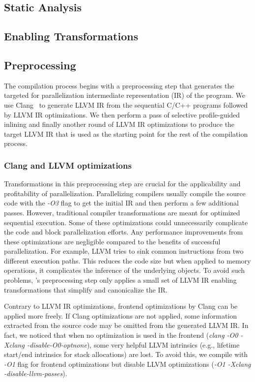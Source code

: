 \subsection {Static Analysis}


\subsection{Enabling Transformations}
\label{design_transf}



\subsection{Preprocessing}

The compilation process begins with a preprocessing step that
generates the targeted for parallelization intermediate representation
(IR) of the program. We use Clang~\cite{LLVM:CGO04} to generate LLVM IR
from the sequential C/C++ programs followed by LLVM IR optimizations.
We then perform a pass of selective profile-guided
inlining and finally another round of LLVM IR optimizations to produce
the target LLVM IR that is used as the starting point for the rest of
the compilation process.

\subsubsection{Clang and LLVM optimizations}

Transformations in this preprocessing step are crucial for the
applicability and profitability of parallelization.
%
Parallelizing compilers usually compile the source code with the \textit{-O3}
flag to get the initial IR and then perform a few additional
passes.
However, traditional compiler transformations are meant for optimized
sequential execution.
%
Some of these optimizations could unnecessarily complicate the code
and block parallelization efforts.
%
Any performance improvements from these optimizations are negligible
compared to the benefits of successful parallelization.
%
For example, LLVM tries to sink common instructions from two different
execution paths. This reduces the code size but when applied to memory
operations, it complicates the inference of the underlying objects.
%
To avoid such problems, \namensp 's preprocessing step only applies a
small set of LLVM IR enabling transformations that simplify and
canonicalize the IR.

Contrary to LLVM IR optimizations, frontend optimizations by Clang can
be applied more freely.
%
If Clang optimizations are not applied, some information extracted
from the source code may be omitted from the generated LLVM IR.  In
fact, we noticed that when no optimization is used in the frontend
(\textit{clang -O0 -Xclang -disable-O0-optnone}), some very helpful
LLVM intrinsics (e.g., lifetime start/end intrinsics for stack
allocations) are lost.  To avoid this, we compile with \textit{-O1} flag for
frontend optimizations but disable LLVM optimizations (\textit{-O1
-Xclang -disable-llvm-passes}).


